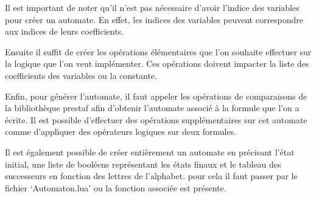 Il est important de noter qu’il n’est pas nécessaire d’avoir l’indice des variables pour créer un automate. En effet, les indices des variables peuvent correspondre aux indices de leurs coefficients.\par

Ensuite il suffit de créer les opérations élémentaires que l’on souhaite effectuer sur la logique que l’on veut implémenter. Ces opérations doivent impacter la liste des coefficients des variables ou la constante.\par

Enfin, pour générer l’automate, il faut appeler les opérations de comparaisons de la bibliothèque prestaf afin d’obtenir l’automate associé à la formule que l’on a écrite. Il est possible d’effectuer des opérations supplémentaires sur cet automate comme d'appliquer des opérateurs logiques sur deux formules.\\\par

Il est également possible de créer entièrement un automate en précisant l’état initial, une liste de booléens représentant les états finaux et le tableau des successeurs en fonction des lettres de l’alphabet. pour cela il faut passer par le fichier ‘Automaton.lua’ ou la fonction associée est présente.
